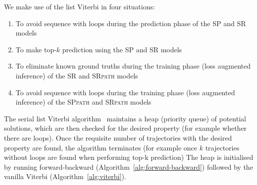 We make use of the list Viterbi in four situations:
\begin{enumerate}
  \item To avoid sequence with loops during the prediction phase of the SP and SR models
  \item To make top-$k$ prediction using the SP and SR models
  \item To eliminate known ground truths during the training phase (\ie loss augmented inference) of the SR and \textsc{SRpath} models
  \item To avoid sequence with loops during the training phase (\ie loss augmented inference) of the \textsc{SPpath} and \textsc{SRpath} models
\end{enumerate}


The serial list Viterbi algorithm~\cite{nilsson2001sequentially,seshadri1994list} maintains
a heap (\ie priority queue) of potential solutions, which are then checked for the desired property (for example
whether there are loops). Once the requisite number of trajectories with the desired
property are found, the algorithm terminates (for example once $k$ trajectories without loops are found when performing top-k prediction)
The heap is initialised by running forward-backward (Algorithm~\ref{alg:forward-backward}) followed by the vanilla Viterbi (Algorithm~\ref{alg:viterbi}).

